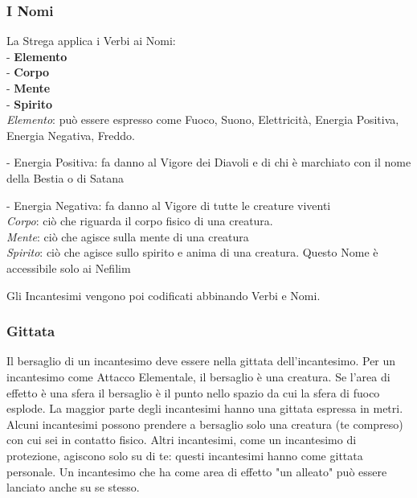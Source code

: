 \documentclass[12pt,a4paper,twoside,openany]{book}
\begin{document}
\begin{multicols}{2}
\subsubsection{I Nomi}

La Strega applica i Verbi ai Nomi:\\


- \textbf{Elemento} \\
- \textbf{Corpo}\\
- \textbf{Mente}\\
- \textbf{Spirito}\\


\textit{Elemento}: può essere espresso come Fuoco, Suono, Elettricità, Energia Positiva, Energia Negativa, Freddo.

- Energia Positiva: fa danno al Vigore dei Diavoli e di chi è marchiato con il nome della Bestia o di Satana

- Energia Negativa: fa danno al Vigore di tutte le creature viventi\\

\textit{Corpo}: ciò che riguarda il corpo fisico di una creatura.\\

\textit{Mente}: ciò che agisce sulla mente di una creatura\\

\textit{Spirito}: ciò che agisce sullo spirito e anima di una creatura. Questo Nome è accessibile solo ai Nefilim

Gli Incantesimi vengono poi codificati abbinando Verbi e Nomi.

\subsubsection{Gittata}\label{magiegittata}

Il bersaglio di un incantesimo deve essere nella gittata dell'incantesimo. Per un incantesimo come Attacco Elementale, il bersaglio è una creatura. Se l'area di effetto è una sfera il bersaglio è il punto nello spazio da cui la sfera di fuoco esplode. La maggior parte degli incantesimi hanno una gittata espressa in metri. Alcuni incantesimi possono prendere a bersaglio solo una creatura (te compreso) con cui sei in contatto fisico. Altri incantesimi, come un incantesimo di protezione, agiscono solo su di te: questi incantesimi hanno come gittata personale. Un incantesimo che ha come area di effetto "un alleato" può essere lanciato anche su se stesso.


\end{multicols}
\end{document}
